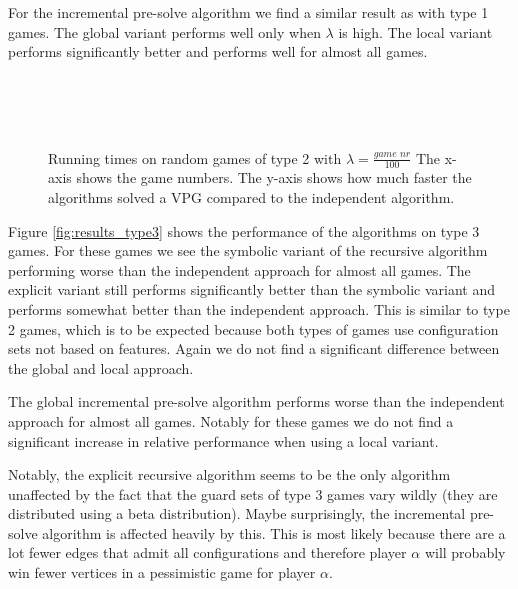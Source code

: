 For the incremental pre-solve algorithm we find a similar result as with type 1 games. The global variant performs well only when $\lambda$ is high. The local variant performs significantly better and performs well for almost all games.
\begin{figure}[H]
	\centering
	\begin{multicols}{2}
		\\
		\\
		\\
		
	\end{multicols}
	\caption{Running times on random games of type 2 with $\lambda = \frac{\textit{game nr}}{100}$ The x-axis shows the game numbers. The y-axis shows how much faster the algorithms solved a VPG compared to the independent algorithm.}
	\label{fig:results_type2}
\end{figure}%

Figure \ref{fig:results_type3} shows the performance of the algorithms on type 3 games. For these games we see the symbolic variant of the recursive algorithm performing worse than the independent approach for almost all games. The explicit variant still performs significantly better than the symbolic variant and performs somewhat better than the independent approach. This is similar to type 2 games, which is to be expected because both types of games use configuration sets not based on features. Again we do not find a significant difference between the global and local approach.

The global incremental pre-solve algorithm performs worse than the independent approach for almost all games. Notably for these games we do not find a significant increase in relative performance when using a local variant.

Notably, the explicit recursive algorithm seems to be the only algorithm unaffected by the fact that the guard sets of type 3 games vary wildly (they are distributed using a beta distribution). Maybe surprisingly, the incremental pre-solve algorithm is affected heavily by this. This is most likely because there are a lot fewer edges that admit all configurations and therefore player $\alpha$ will probably win fewer vertices in a pessimistic game for player $\alpha$.

